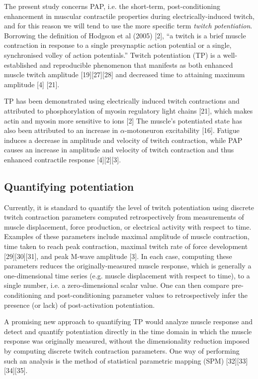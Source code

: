 \documentclass[utf8]{FrontiersinHarvard}
\begin{document}
The present study concerns PAP, i.e. the short-term, post-conditioning enhancement in muscular contractile properties during electrically-induced twitch, and for this reason we will tend to use the more specific term \textit{twitch potentiation}.
Borrowing the definition of Hodgson et al (2005) [2],
``a twitch is a brief muscle contraction in response to a single presynaptic action potential or a single, synchronised volley of action potentials.''
Twitch potentiation (TP) is a well-established and reproducible phenomenon that manifests as both enhanced muscle twitch amplitude [19][27][28] and decreased time to attaining maximum amplitude [4] \cite{sale} [21].

TP has been demonstrated using electrically induced twitch contractions and attributed to phosphorylation of myosin regulatory light chains [21], which makes actin and myosin more sensitive to  ions [2]
The muscle's potentiated state has also been attributed to an increase in $ \alpha $-motoneuron excitability [16].
Fatigue induces a decrease in amplitude and velocity of twitch contraction, while PAP causes an increase in amplitude and velocity of twitch contraction and thus enhanced contractile response [4][2][3].

\subsection{Quantifying potentiation}
Currently, it is standard to quantify the level of twitch potentiation using discrete twitch contraction parameters computed retrospectively from measurements of muscle displacement, force production, or electrical activity with respect to time.
Examples of these parameters include maximal amplitude of muscle contraction, time taken to reach peak contraction, maximal twitch rate of force development [29][30][31], and peak M-wave amplitude [3].
In each case, computing these parameters reduces the originally-measured muscle response, which is generally a one-dimensional time series (e.g. muscle displacement with respect to time), to a single number, i.e. a zero-dimensional scalar value.
One can then compare pre-conditioning and post-conditioning parameter values to retrospectively infer the presence (or lack) of post-activation potentiation.

A promising new approach to quantifying TP would analyze 
muscle response and detect and quantify potentiation directly in the time domain in which the muscle response was originally measured, without the dimensionality reduction imposed by computing discrete twitch contraction parameters.
One way of performing such an analysis is the method of statistical parametric mapping (SPM) [32][33][34][35].
\end{document}
